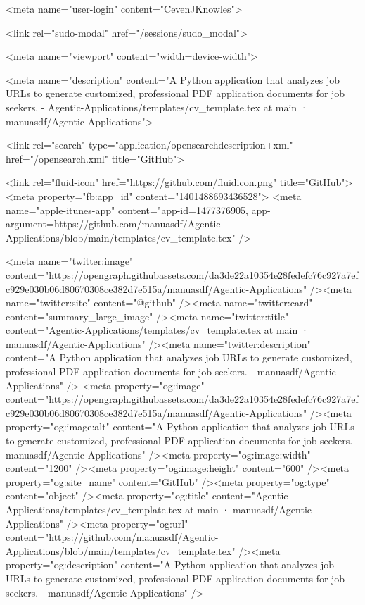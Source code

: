   




    <meta name="user-login" content="CevenJKnowles">

  <link rel="sudo-modal" href="/sessions/sudo_modal">

    <meta name="viewport" content="width=device-width">

    

      <meta name="description" content="A Python application that analyzes job URLs to generate customized, professional PDF application documents for job seekers. - Agentic-Applications/templates/cv_template.tex at main · manuasdf/Agentic-Applications">

      <link rel="search" type="application/opensearchdescription+xml" href="/opensearch.xml" title="GitHub">

    <link rel="fluid-icon" href="https://github.com/fluidicon.png" title="GitHub">
    <meta property="fb:app_id" content="1401488693436528">
    <meta name="apple-itunes-app" content="app-id=1477376905, app-argument=https://github.com/manuasdf/Agentic-Applications/blob/main/templates/cv_template.tex" />

      <meta name="twitter:image" content="https://opengraph.githubassets.com/da3de22a10354e28fedefc76c927a7efc929e030b06d80670308ce382d7e515a/manuasdf/Agentic-Applications" /><meta name="twitter:site" content="@github" /><meta name="twitter:card" content="summary_large_image" /><meta name="twitter:title" content="Agentic-Applications/templates/cv_template.tex at main · manuasdf/Agentic-Applications" /><meta name="twitter:description" content="A Python application that analyzes job URLs to generate customized, professional PDF application documents for job seekers. - manuasdf/Agentic-Applications" />
  <meta property="og:image" content="https://opengraph.githubassets.com/da3de22a10354e28fedefc76c927a7efc929e030b06d80670308ce382d7e515a/manuasdf/Agentic-Applications" /><meta property="og:image:alt" content="A Python application that analyzes job URLs to generate customized, professional PDF application documents for job seekers. - manuasdf/Agentic-Applications" /><meta property="og:image:width" content="1200" /><meta property="og:image:height" content="600" /><meta property="og:site_name" content="GitHub" /><meta property="og:type" content="object" /><meta property="og:title" content="Agentic-Applications/templates/cv_template.tex at main · manuasdf/Agentic-Applications" /><meta property="og:url" content="https://github.com/manuasdf/Agentic-Applications/blob/main/templates/cv_template.tex" /><meta property="og:description" content="A Python application that analyzes job URLs to generate customized, professional PDF application documents for job seekers. - manuasdf/Agentic-Applications" />
  


